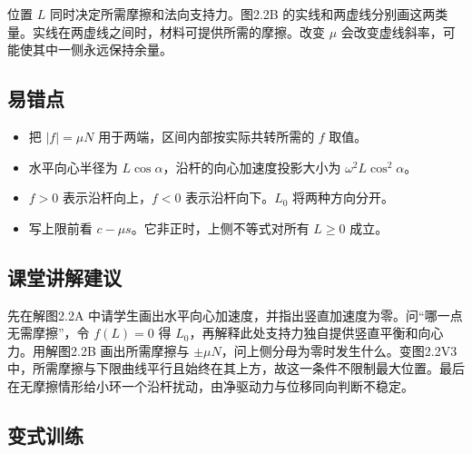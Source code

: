 \documentclass[UTF8,fontset=fandol,a4paper,11pt]{ctexart}
\begin{document}
位置 $L$ 同时决定所需摩擦和法向支持力。图2.2B 的实线和两虚线分别画这两类量。实线在两虚线之间时，材料可提供所需的摩擦。改变 $\mu$ 会改变虚线斜率，可能使其中一侧永远保持余量。



\subsection*{易错点}

\begin{itemize}
\item 把 $|f|=\mu N$ 用于两端，区间内部按实际共转所需的 $f$ 取值。
\item 水平向心半径为 $L\cos\alpha$，沿杆的向心加速度投影大小为 $\omega^2L\cos^2\alpha$。
\item $f>0$ 表示沿杆向上，$f<0$ 表示沿杆向下。$L_0$ 将两种方向分开。
\item 写上限前看 $c-\mu s$。它非正时，上侧不等式对所有 $L\geq0$ 成立。
\end{itemize}



\subsection*{课堂讲解建议}

先在解图2.2A 中请学生画出水平向心加速度，并指出竖直加速度为零。问“哪一点无需摩擦”，令 $f(L)=0$ 得 $L_0$，再解释此处支持力独自提供竖直平衡和向心力。用解图2.2B 画出所需摩擦与 $\pm\mu N$，问上侧分母为零时发生什么。变图2.2V3 中，所需摩擦与下限曲线平行且始终在其上方，故这一条件不限制最大位置。最后在无摩擦情形给小环一个沿杆扰动，由净驱动力与位移同向判断不稳定。



\subsection*{变式训练}
\end{document}
